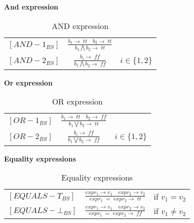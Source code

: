 \textbf{And expression}
	
    \bgroup
    \def\arraystretch{3}
    \begin{table}[H]
    \centering
    \begin{tabular}{l c l}
        
        $[AND-1_{BS}]$ &$\frac{b_1 \rightarrow \; tt \quad b_2 \rightarrow \; tt}{b_1 \bigwedge b_2 \rightarrow \; tt}$ & \\
    
        $[AND-2_{BS}]$ &$\frac{b_i \rightarrow \; ff}{b_1 \bigwedge b_2 \rightarrow \; ff}$ & $i \in \{1, 2\}$\\
        
    \end{tabular}
    \caption{AND expression}
    \label{tab:andexpr}
    \end{table}
    \egroup

\textbf{Or expression}

    \bgroup
    \def\arraystretch{3}
    \begin{table}[H]
    \centering
    \begin{tabular}{l c l}
        
        $[OR-1_{BS}]$ &$\frac{b_1 \rightarrow \; tt \quad b_2 \rightarrow \; ff}{b_1 \bigvee b_2 \rightarrow \; tt}$ & \\
    
        $[OR-2_{BS}]$ &$\frac{b_i \rightarrow \; ff}{b_1 \bigvee b_2 \rightarrow \; ff}$ & $i \in \{1, 2\}$\\
        
    \end{tabular}
    \caption{OR expression}
    \label{tab:orexpr}
    \end{table}
    \egroup
    
\textbf{Equality expressions}
  
    \bgroup
    \def\arraystretch{3}
    \begin{table}[H]
    \centering
    \begin{tabular}{l c l}
        
        $[EQUALS-T_{BS}]$ &$\frac{expr_1 \rightarrow v_1 \quad expr_2 \rightarrow v_2}{expr_1\;=\;expr_2 \rightarrow \; tt}$ & if $v_1 = v_2$ \\
        
        $[EQUALS-\bot_{BS}]$ &$\frac{expr_1 \rightarrow v_1 \quad expr_2 \rightarrow v_2}{expr_1\;=\;expr_2 \rightarrow \; ff}$ & if $v_1 \ne v_2$ \\
        
    \end{tabular}
    \caption{Equality expressions}
    \label{tab:equaexpr}
    \end{table}
    \egroup

